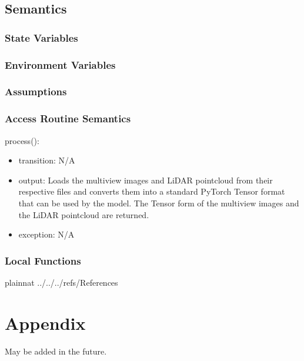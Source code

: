 \documentclass[12pt, titlepage]{article}
\begin{document}
\subsection{Semantics}

\subsubsection{State Variables}



\subsubsection{Environment Variables}



\subsubsection{Assumptions}

\newpage



\subsubsection{Access Routine Semantics}
\noindent process():
\begin{itemize}
\item transition: N/A 
\item output: Loads the multiview images and LiDAR pointcloud from their respective files and converts them into a standard PyTorch Tensor format that can be used by the model. The Tensor form of the multiview images and the LiDAR pointcloud are returned.
\item exception: N/A
\end{itemize}

\subsubsection{Local Functions}


\newpage

 {plainnat}
 {../../../refs/References}

\newpage




\section{Appendix} \label{Appendix}

May be added in the future.
\end{document}
